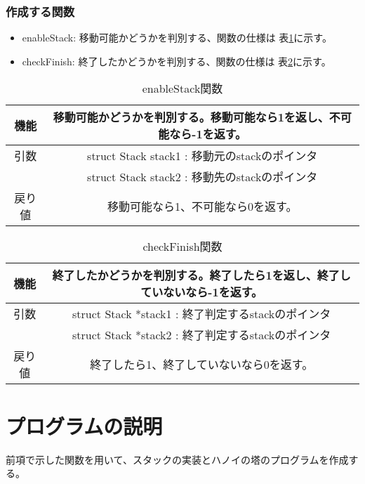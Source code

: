 \documentclass[a4paper,11pt]{jsarticle}
\begin{document}
\subsubsection{作成する関数}
\begin{itemize}
  \item enableStack: 移動可能かどうかを判別する、関数の仕様は 表\ref{tab:enablestack_func}に示す。
  \item checkFinish: 終了したかどうかを判別する、関数の仕様は 表\ref{tab:checkfinish_func}に示す。
\end{itemize}
\begin{table}[ht]
  \centering
  \begin{tabular}{|c|c|}
    \hline
    機能  & 移動可能かどうかを判別する。移動可能なら1を返し、不可能なら-1を返す。 \\
    \hline
    引数  & struct Stack stack1 : 移動元のstackのポインタ \\
        & struct Stack stack2 : 移動先のstackのポインタ \\
    \hline
    戻り値 & 移動可能なら1、不可能なら0を返す。                   \\
    \hline
  \end{tabular}
  \caption{enableStack関数}
  \label{tab:enablestack_func}
\end{table}
\begin{table}[ht]
  \centering
  \begin{tabular}{|c|c|}
    \hline
    機能  & 終了したかどうかを判別する。終了したら1を返し、終了していないなら-1を返す。 \\
    \hline
    引数  & struct Stack *stack1 : 終了判定するstackのポインタ \\
        & struct Stack *stack2 : 終了判定するstackのポインタ \\
    \hline
    戻り値 & 終了したら1、終了していないなら0を返す。                   \\
    \hline
  \end{tabular}
  \caption{checkFinish関数}
  \label{tab:checkfinish_func}
\end{table}
\section{プログラムの説明}
前項で示した関数を用いて、スタックの実装とハノイの塔のプログラムを作成する。
\end{document}
